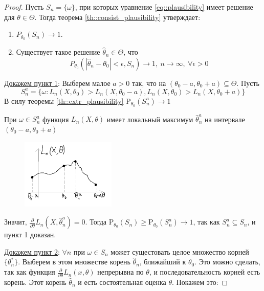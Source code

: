 \documentclass[12pt]{article}
\theoremstyle{basic_theorem}
\theoremstyle{name_theorem}
\def\P{
    \mathrm{P}
}
\begin{document}
    \begin{proof}
        Пусть $S_n = \{\omega\}$, при которых уравнение \ref{eq::plausibility} имеет
        решение для $\theta\in\Theta$. Тогда теорема \ref{th::consist_plausibility} утверждает:
        \begin{enumerate}
            \item $P_{\theta_0}(S_n) \rightarrow 1$.
            \item Существует такое решение $\hat{\theta}_n \in \Theta$, что
                $$P_{\theta_0} (|\hat{\theta}_n - \theta_0| < \epsilon, S_n) \rightarrow 1,\ n\rightarrow\infty,\ \forall\epsilon>0$$
        \end{enumerate}
        \underline{Докажем пункт 1}: Выберем малое $a>0$ так, что на $(\theta_0 - a, \theta_0 + a) \subseteq\Theta$. Пусть
        $$S^a_n = \{\omega: L_n(X, \theta_0) > L_n(X, \theta_0 - a), L_n(X, \theta_0) > L_n(X, \theta_0 + a)\}$$
        В силу теоремы \ref{th::extr_plausibility} $\P_{\theta_0}(S_n^a) \rightarrow 1$

        При $\omega\in S_n^a$ функция $L_n(X, \theta)$ имеет
        локальный максимум $\hat{\theta}^a_n$ на интервале $(\theta_0 - a, \theta_0 + a)$
        \begin{figure}[h]
            \includegraphics[width=0.4\textwidth]{L_n_func}
        \end{figure}
        
        Значит, $\frac{\partial}{\partial\theta}L_n(X, \hat{\theta}_n^a) = 0$.
        Тогда $\P_{\theta_0}(S_n) \geq \P_{\theta_0}(S_n^a) \rightarrow 1$, так
        как $S_n^a \subseteq S_n$, и пункт 1 доказан.

        \underline{Докажем пункт 2}: $\forall n$ при $\omega\in S_n$ может сущестовать целое множество корней
        $\{\theta^*_n\}$. Выберем в этом множестве корень $\hat{\theta}_n$,
        ближайший к $\theta_0$. Это можно сделать, так как
        функция $\frac{\partial}{\partial\theta} L_n(x, \theta)$ непрерывна по $\theta$,
        и последовательность корней есть корень. Этот корень $\hat{\theta}_n$
        и есть состоятельная оценка $\theta$. Покажем это:


\end{proof}
\end{document}
